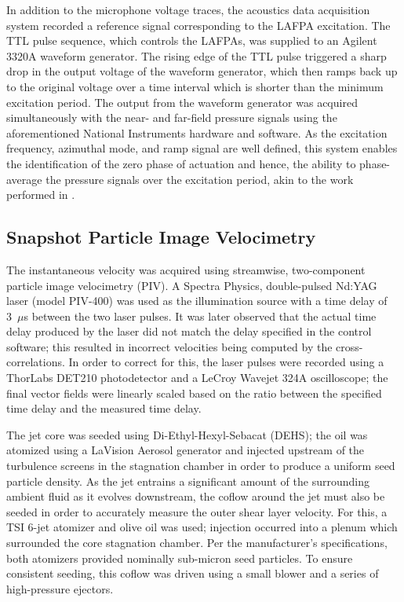 In addition to the microphone voltage traces, the acoustics data acquisition system recorded a reference signal corresponding to the LAFPA excitation. 
The TTL pulse sequence, which controls the LAFPAs, was supplied to an Agilent 3320A waveform generator. 
The rising edge of the TTL pulse triggered a sharp drop in the output voltage of the waveform generator, which then ramps back up to the original voltage over a time interval which is shorter than the minimum excitation period. 
The output from the waveform generator was acquired simultaneously with the near- and far-field pressure signals using the aforementioned National Instruments hardware and software. 
As the excitation frequency, azimuthal mode, and ramp signal are well defined, this system enables the identification of the zero phase of actuation and hence, the ability to phase-average the pressure signals over the excitation period, akin to the work performed in \citet{Sinha2012}. 

\subsection{Snapshot Particle Image Velocimetry}
\label{sect:piv_method}
The instantaneous velocity was acquired using streamwise, two-component particle image velocimetry (PIV). 
A Spectra Physics, double-pulsed Nd:YAG laser (model PIV-400) was used as the illumination source with a time delay of 3~$\mu$s between the two laser pulses.
It was later observed that the actual time delay produced by the laser did not match the delay specified in the control software; this resulted in incorrect velocities being computed by the cross-correlations.
In order to correct for this, the laser pulses were recorded using a ThorLabs DET210 photodetector and a LeCroy Wavejet 324A oscilloscope; the final vector fields were linearly scaled based on the ratio between the specified time delay and the measured time delay.

The jet core was seeded using Di-Ethyl-Hexyl-Sebacat (DEHS); the oil was atomized using a LaVision Aerosol generator and injected upstream of the turbulence screens in the stagnation chamber in order to produce a uniform seed particle density.
As the jet entrains a significant amount of the surrounding ambient fluid as it evolves downstream, the coflow around the jet must also be seeded in order to accurately measure the outer shear layer velocity.
For this, a TSI 6-jet atomizer and olive oil was used; injection occurred into a plenum which surrounded the core stagnation chamber.
Per the manufacturer's specifications, both atomizers provided nominally sub-micron seed particles.
To ensure consistent seeding, this coflow was driven using a small blower and a series of high-pressure ejectors. 

